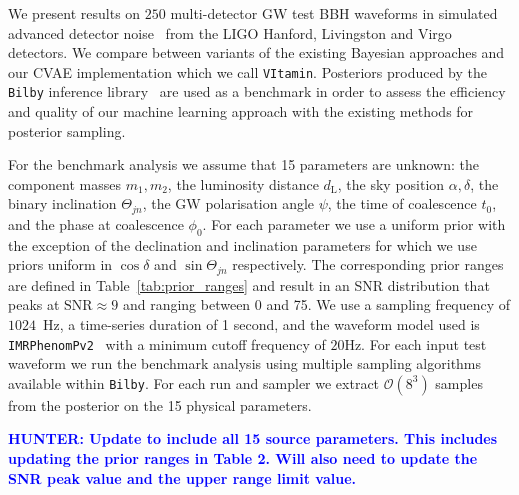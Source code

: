 \documentclass[%
showpacs,
nofootinbib,
 amsmath,amssymb,
 aps,
 twocolumn,
 prl,
 reprint,
floatfix,
]{revtex4-1}
\newcommand{\hunter}[1]{\textbf{\textcolor{blue}{HUNTER: #1}}}
\begin{document}
%
%

%
%
%
%
We present results on $250$ multi-detector \ac{GW} test \ac{BBH}
waveforms in simulated advanced detector noise~\cite{aligo_noisecurves}
from the LIGO Hanford, Livingston and Virgo detectors. We compare between
variants of the existing Bayesian approaches and our \ac{CVAE} implementation
which we call \texttt{VItamin}. Posteriors produced by the \texttt{Bilby}
inference library~\cite{1811.02042} are used as a benchmark in order to assess
the efficiency and quality of our machine learning approach with the existing
methods for posterior sampling.

%
%
For the benchmark analysis we assume that 15 parameters are
unknown: the component masses
$m_1,m_2$, the luminosity distance $d_{\text{L}}$, the sky position
$\alpha,\delta$, the binary inclination $\Theta_{jn}$, the \ac{GW} polarisation
angle ${\psi}$, the time of coalescence $t_{0}$, and the phase at coalescence
$\phi_0$. For each parameter we use a uniform prior with the exception of
the declination and inclination parameters for which we use priors uniform in
$\cos\delta$ and $\sin\Theta_{jn}$ respectively. The corresponding prior ranges
are defined in Table~\ref{tab:prior_ranges} and result in an \ac{SNR}
distribution that peaks at $\text{SNR}\approx 9$ and ranging between 0 and 75.
We use a sampling frequency of $1024$~Hz, a time-series duration of 1 second, and
the waveform model used is \texttt{IMRPhenomPv2}~\cite{1809.10113} with a
minimum cutoff frequency of $20$Hz. For each input test waveform we run the
benchmark analysis using multiple sampling algorithms available within
\texttt{Bilby}. For each run and sampler we extract $\mathcal{O}(8^3)$
samples from the posterior on the 15 physical parameters.  

\hunter{Update to include all 15 source parameters.  This includes updating the prior ranges 
in Table 2.  Will also need to update the SNR peak value and the upper range limit value.}
\end{document}

